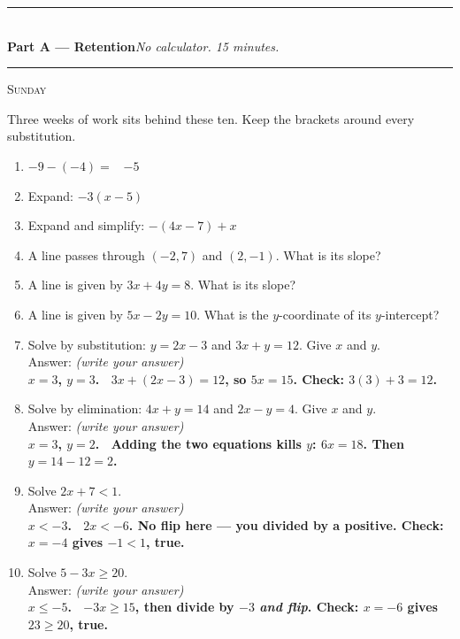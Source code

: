 \documentclass[11pt,a4paper]{article}
\newif\ifANSWERS
\newcommand{\PartHead}[2]{%
  \vspace{6pt}
  {\color{navy}\rule{\textwidth}{0.8pt}}\\[2pt]
  {\large\bfseries\color{navy}#1}\hfill{\small\itshape #2}\\[-4pt]
  {\color{navy}\rule{\textwidth}{0.4pt}}
  \vspace{4pt}
}
\newcommand{\sitting}[1]{{\footnotesize\textsc{\color{navy}#1}}\par\vspace{2pt}}
\newcommand{\spr}{\\[3pt]\hspace*{6pt}Answer: \underline{\hspace{3.2cm}}\hfill{\footnotesize\itshape(write your answer)}}
\newcommand{\ans}[1]{\ {\color{keyred}\bfseries #1}}
\newcommand{\ans}[1]{}
\begin{document}
\PartHead{Part A --- Retention}{No calculator. 15 minutes.}
\sitting{Sunday}
Three weeks of work sits behind these ten. Keep the brackets around every substitution.

\begin{enumerate}[leftmargin=20pt,itemsep=5pt]
\item $-9-(-4)=$ \ifANSWERS\else\underline{\hspace{3.5cm}}\fi \ans{$-5$}
\item Expand: $-3(x-5)$ \ifANSWERS\ans{$=-3x+15$}\else\ \underline{\hspace{5.4cm}}\fi
\item Expand and simplify: $-(4x-7)+x$ \ifANSWERS\ans{$=-3x+7$}\else\ \underline{\hspace{4cm}}\fi
\item A line passes through $(-2,7)$ and $(2,-1)$. What is its slope?
  \ifANSWERS\ans{$-2$. \ $\dfrac{-1-7}{2-(-2)}=\dfrac{-8}{4}=-2$.}\else\ \underline{\hspace{4.4cm}}\fi
\item A line is given by $3x+4y=8$. What is its slope?
  \ifANSWERS\ans{$-3/4$. \ $y=-\dfrac{3}{4}x+2$.}\else\ \underline{\hspace{4.4cm}}\fi
\item A line is given by $5x-2y=10$. What is the $y$-coordinate of its $y$-intercept?
  \ifANSWERS\ans{$-5$. \ Put $x=0$: $-2y=10$.}\else\ \underline{\hspace{3.4cm}}\fi
\item Solve by substitution: $y=2x-3$ and $3x+y=12$. Give $x$ and $y$. \spr
  \ans{\\ $x=3$, $y=3$. \ $3x+(2x-3)=12$, so $5x=15$. Check: $3(3)+3=12$.}

\item Solve by elimination: $4x+y=14$ and $2x-y=4$. Give $x$ and $y$. \spr
  \ans{\\ $x=3$, $y=2$. \ Adding the two equations kills $y$: $6x=18$. Then $y=14-12=2$.}

\item Solve $2x+7<1$. \spr
  \ans{\\ $x<-3$. \ $2x<-6$. No flip here --- you divided by a positive. Check: $x=-4$ gives $-1<1$, true.}

\item Solve $5-3x\ge20$. \spr
  \ans{\\ $x\le-5$. \ $-3x\ge15$, then divide by $-3$ \emph{and flip}. Check: $x=-6$ gives $23\ge20$, true.}
\end{enumerate}
\end{document}
